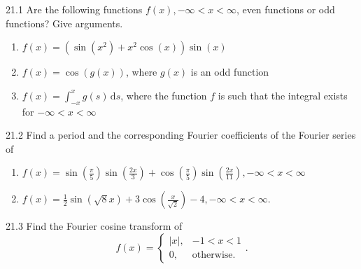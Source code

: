 
\begin{problem}{21.1}
  Are the following functions $f(x), -\infty< x < \infty$, even functions or odd functions?
  Give arguments.

  \begin{enumerate}[label=\alph*)]
    \item $f(x) = \left( \sin \left( x^2 \right) + x^2 \cos (x) \right) \sin (x)$
    \item $f(x) = \cos(g(x))$, where $g(x)$ is an odd function
    \item $f(x) = \int_{-x}^{x} g(s) \, \mathrm{d}s$, where the function $f$ is such that the integral exists for $-\infty < x < \infty$
  \end{enumerate}
\end{problem}

\begin{problem}{21.2}
  Find a period and the corresponding Fourier coefficients of the Fourier series of
  \begin{enumerate}[label=\alph*)]
    \item $f(x) = \sin \left( \frac{\pi}{5} \right) \sin \left( \frac{2x}{3} \right) + \cos \left( \frac{\pi}{5} \right) \sin \left( \frac{2x}{11} \right), -\infty<x<\infty$
    \item $f(x) = \frac{1}{2} \sin \left( \sqrt{8}x \right) + 3 \cos \left( \frac{x}{\sqrt{2}} \right) - 4, -\infty < x< \infty$.
  \end{enumerate}
\end{problem}

\begin{problem}{21.3}
  Find the Fourier cosine transform of
  \begin{equation*}
    f(x) = \begin{cases}
      \left| x \right|, &  -1 < x < 1\\
    0,  & \text{otherwise}
    .\end{cases}
  .\end{equation*}
\end{problem}

